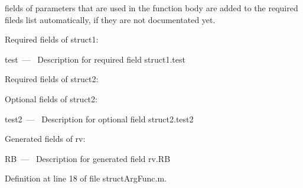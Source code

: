 fields of parameters that are used in the function body are added to the required fileds list automatically, if they are not documentated yet.

\begin{DoxyParagraph}{Required fields of struct1\+:}
\begin{DoxyItemize}
\item {\ttfamily test~---~} Description for required field struct1.\+test\end{DoxyItemize}

\end{DoxyParagraph}
\begin{DoxyParagraph}{Required fields of struct2\+:}

\end{DoxyParagraph}
\begin{DoxyParagraph}{Optional fields of struct2\+:}
\begin{DoxyItemize}
\item {\ttfamily test2~---~} Description for optional field struct2.\+test2\end{DoxyItemize}

\end{DoxyParagraph}
\begin{DoxyParagraph}{Generated fields of rv\+:}
\begin{DoxyItemize}
\item {\ttfamily R\+B~---~} Description for generated field rv.\+R\+B \end{DoxyItemize}

\end{DoxyParagraph}


Definition at line 18 of file struct\+Arg\+Func.\+m.

